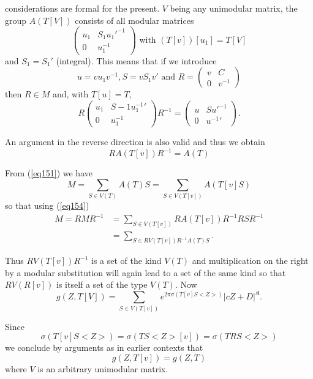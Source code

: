 considerations are formal for the present. $V$ being any unimodular
matrix, the group $A (T [V])$ consists of all modular matrices 
$$
\begin{pmatrix}
u_1 & S_1 u_1'^{-1} \\
0 & u_1^{-1} \end{pmatrix} \text{ with } ( T [ v ] ) [ u_1 ] = T [ V ]
$$
and $S_1 = S_1'$ (integral). This means that if we introduce 
$$
u = v u_1 v^{-1}, S  =  v S_1 v' \text{ and } R = \begin{pmatrix} v & C
  \\ 0 & v^{-1} \end{pmatrix} 
$$
then $R \in M$ and, with $T [ u] = T$,
$$
 R \begin{pmatrix} u_1 & S-1 u_{1}^{-1}{'} \\
0 & u_1^{-1} \end{pmatrix} R^{-1} = \begin{pmatrix} u &S u{'}^{-1}
   \\ 0 & u^{-1}{'} \end{pmatrix}. 
$$

An argument in the reverse direction is also valid and thus we obtain  
\begin{equation*}
R A (T [ v ])R^{-1} = A (T) \tag{154}\label{eq154}
\end{equation*}

From (\ref{eq151}) we have
$$
M = \sum_{S \in V (T)} A (T) S = \sum_{S \in V (T [ v ])} A (T[ v ] S
) 
$$\pageoriginale  
so that using (\ref{eq154})
\begin{align*}
M = R M R^{-1} &= \sum_{S \in V (T [ v ])} R A (T [ v ]) R^{-1} R S
R^{-1} \\ 
&= \sum_{S \in R V (T [ v ]) R^{-1}  A (T)S}.
\end{align*}

Thus $R V (T [ v ]) R^{-1}$ is a set of the kind $V (T)$ and
multiplication on the right by a modular substitution will again lead
to a set of the same kind so that $ R V (R [ v ])$ is itself a set of
the type $V(T)$. Now  
$$
g (Z, T [ V ]) = \sum_{S \in V (T [ v ])}  e^{2\pi \sigma (T [ v ] S <
  Z >)} | cZ + D |^{\mathfrak{K}}. 
$$

Since
$$
\sigma (T [ v ] S < Z > ) = \sigma (T S < Z > [ v ]) = \sigma (TRS < Z
>) 
$$
we conclude by arguments as in earlier contexts that 
\begin{equation*}
g (Z, T [ v ]) = g (Z, T) \tag{155}\label{eq155}
\end{equation*}
where $V$ is an arbitrary unimodular matrix.

